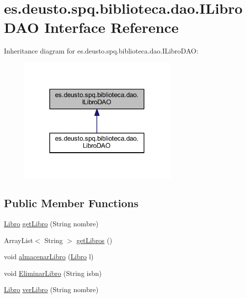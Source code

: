 \hypertarget{interfacees_1_1deusto_1_1spq_1_1biblioteca_1_1dao_1_1_i_libro_d_a_o}{}\section{es.\+deusto.\+spq.\+biblioteca.\+dao.\+I\+Libro\+D\+AO Interface Reference}
\label{interfacees_1_1deusto_1_1spq_1_1biblioteca_1_1dao_1_1_i_libro_d_a_o}


Inheritance diagram for es.\+deusto.\+spq.\+biblioteca.\+dao.\+I\+Libro\+D\+AO\+:
\nopagebreak
\begin{figure}[H]
\begin{center}
\leavevmode
\includegraphics[width=224pt]{interfacees_1_1deusto_1_1spq_1_1biblioteca_1_1dao_1_1_i_libro_d_a_o__inherit__graph}
\end{center}
\end{figure}
\subsection*{Public Member Functions}
\begin{DoxyCompactItemize}
\item 
\mbox{\hyperlink{classes_1_1deusto_1_1spq_1_1biblioteca_1_1data_1_1_libro}{Libro}} \mbox{\hyperlink{interfacees_1_1deusto_1_1spq_1_1biblioteca_1_1dao_1_1_i_libro_d_a_o_a1406f445c6462b6ef7a6d53422650f20}{get\+Libro}} (String nombre)
\item 
Array\+List$<$ String $>$ \mbox{\hyperlink{interfacees_1_1deusto_1_1spq_1_1biblioteca_1_1dao_1_1_i_libro_d_a_o_ad8d7e48cb052174072938ca00ace7fea}{get\+Libros}} ()
\item 
void \mbox{\hyperlink{interfacees_1_1deusto_1_1spq_1_1biblioteca_1_1dao_1_1_i_libro_d_a_o_ad8e76a77aa5fc0900142921d7efb79f0}{almacenar\+Libro}} (\mbox{\hyperlink{classes_1_1deusto_1_1spq_1_1biblioteca_1_1data_1_1_libro}{Libro}} l)
\item 
void \mbox{\hyperlink{interfacees_1_1deusto_1_1spq_1_1biblioteca_1_1dao_1_1_i_libro_d_a_o_afb545c6295192e9cde403bf72dbc5818}{Eliminar\+Libro}} (String isbn)
\item 
\mbox{\hyperlink{classes_1_1deusto_1_1spq_1_1biblioteca_1_1data_1_1_libro}{Libro}} \mbox{\hyperlink{interfacees_1_1deusto_1_1spq_1_1biblioteca_1_1dao_1_1_i_libro_d_a_o_ae390d687e8e4ec02a401291da5076062}{ver\+Libro}} (String nombre)
\end{DoxyCompactItemize}



